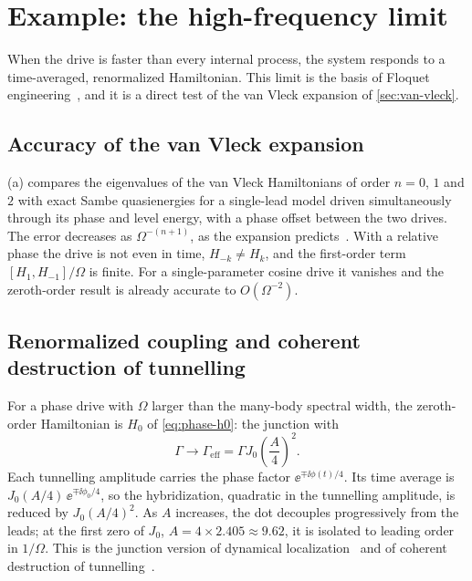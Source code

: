 \chapter{Example: the high-frequency limit}\label{ch:ex-highfreq}

When the drive is faster than every internal process, the system responds to a
time-averaged, renormalized Hamiltonian. This limit is the basis of Floquet
engineering~\cite{goldman2014periodically,bukov2015universal,eckardt2017colloquium}, and it is
a direct test of the van Vleck expansion of \cref{sec:van-vleck}.

\section{Accuracy of the van Vleck expansion}

(a) compares the eigenvalues of the van Vleck Hamiltonians of order
$n=0$, $1$ and $2$ with exact Sambe quasienergies for a single-lead model driven
simultaneously through its phase and level energy, with a phase offset between the two
drives. The error decreases as $\Omega^{-(n+1)}$, as the expansion
predicts~\cite{eckardt2015high,mikami2016brillouin}. With a relative phase the drive is not
even in time, $H_{-k}\ne H_k$, and the first-order term $[H_1,H_{-1}]/\Omega$ is finite. For a
single-parameter cosine drive it vanishes and the zeroth-order result is already accurate to
$O(\Omega^{-2})$.

\section{Renormalized coupling and coherent destruction of tunnelling}

For a phase drive with $\Omega$ larger than the many-body spectral width, the zeroth-order
Hamiltonian is $H_0$ of \cref{eq:phase-h0}: the junction with
\begin{equation}\label{eq:gamma-renorm}
  \Gamma\to\Gamma_{\mathrm{eff}}=\Gamma J_0\!\left(\frac A4\right)^2.
\end{equation}
Each tunnelling amplitude carries the phase factor $\ee^{\mp\ii\phi(t)/4}$. Its time average is
$J_0(A/4)\,\ee^{\mp\ii\phi_0/4}$, so the hybridization, quadratic in the tunnelling amplitude,
is reduced by $J_0(A/4)^2$. As $A$ increases, the dot decouples progressively from the leads; at
the first zero of $J_0$, $A=4\times2.405\approx9.62$, it is isolated to leading order in
$1/\Omega$. This is the junction version of dynamical
localization~\cite{dunlap1986dynamic,holthaus1992collapse,lignier2007dynamical} and of
coherent destruction of tunnelling~\cite{grossmann1991coherent,kayanuma1994role}.

